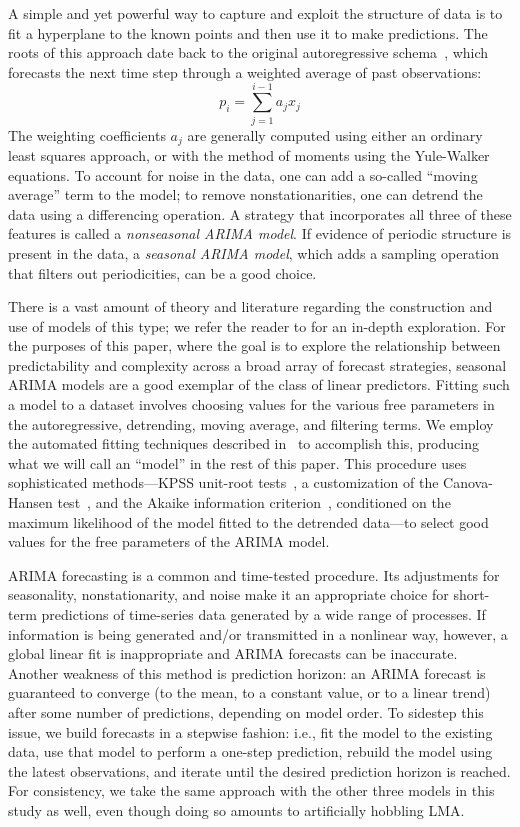 A simple and yet powerful way to capture and exploit the structure of
data is to fit a hyperplane to the known points and then use it to
make predictions.  The roots of this approach date back to the
original autoregressive schema~\cite{weigend93}, which forecasts the
next time step through a weighted average of past observations: $$p_i
= \sum_{j=1}^{i-1} a_j x_j$$ The weighting coefficients $a_j$ are
generally computed using either an ordinary least squares approach, or
with the method of moments using the Yule-Walker equations.  To
account for noise in the data, one can add a so-called ``moving
average'' term to the model; to remove nonstationarities, one can
detrend the data using a differencing operation.  A strategy that
incorporates all three of these features is called a \emph{nonseasonal
  ARIMA model}.  If evidence of periodic structure is present in the
data, a \emph{seasonal ARIMA model}, which adds a sampling operation
that filters out periodicities, can be a good choice.

There is a vast amount of theory and literature regarding the
construction and use of models of this type; we refer the reader to
\cite{davislinearts} for an in-depth exploration.  For the purposes of
this paper, where the goal is to explore the relationship between
predictability and complexity across a broad array of forecast
strategies, seasonal ARIMA models are a good exemplar of the class of
linear predictors.  Fitting such a model to a dataset involves
choosing values for the various free parameters in the autoregressive,
detrending, moving average, and filtering terms.  We employ the
automated fitting techniques described in~\cite{autoARIMA} to
accomplish this, producing what we will call an ``\arima model'' in
the rest of this paper.  This procedure uses sophisticated
methods---KPSS unit-root tests~\cite{KPSSunit}, a customization of the
Canova-Hansen test~\cite{Canova1995}, and the Akaike information
criterion~\cite{akaike1974}, conditioned on the maximum likelihood of
the model fitted to the detrended data---to select good values for the
free parameters of the ARIMA model.

ARIMA forecasting is a common and time-tested procedure.  Its
adjustments for seasonality, nonstationarity, and noise make it an
appropriate choice for short-term predictions of time-series data
generated by a wide range of processes.  If information is being
generated and/or transmitted in a nonlinear way, however, a global
linear fit is inappropriate and ARIMA forecasts can be inaccurate.
Another weakness of this method is prediction horizon: an ARIMA
forecast is guaranteed to converge (to the mean, to a constant value,
or to a linear trend) after some number of predictions, depending on
model order.  To sidestep this issue, we build forecasts in a stepwise
fashion: i.e., fit the \arima model to the existing data, use that
model to perform a one-step prediction, rebuild the \arima model using
the latest observations, and iterate until the desired prediction
horizon is reached.  For consistency, we take the same approach with
the other three models in this study as well, even though doing so
amounts to artificially hobbling LMA.

